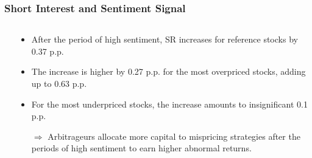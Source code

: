 \documentclass{beamer}
\begin{document}
\begin{frame}
		\frametitle{Short Interest and Sentiment Signal}
\vspace*{-.5cm}
		\begin{columns}[t]
 \begin{column}{.32\textwidth} 
 \vspace*{-.45cm} 
\begin{table}[htbp]
  	\resizebox{\textwidth}{!}{
	 	
	\label{tab:surp}%
	}
\end{table} 
\end{column}
\begin{column}{.68\textwidth}
\begin{itemize}
\item After the period of high sentiment, SR increases for reference stocks by 0.37 p.p.
\item The increase is higher by 0.27 p.p. for the most overpriced stocks, adding up to 0.63 p.p.
\item For the most underpriced stocks, the increase amounts to insignificant 0.1 p.p.
\item[$\Rightarrow$] Arbitrageurs allocate more capital to mispricing strategies after the periods of high sentiment to earn higher abnormal returns. 
\end{itemize}
\end{column}
   \end{columns}
\end{frame}
\end{document}
